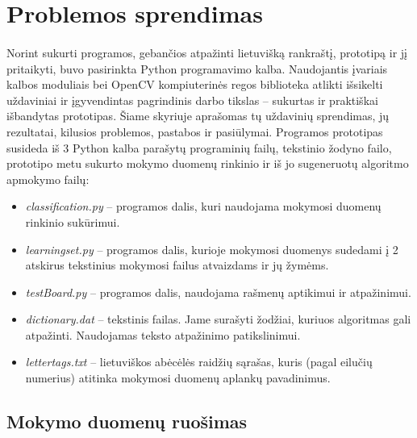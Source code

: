 \documentclass[a4paper,12pt]{article}
\begin{document}
\clearpage
\section{Problemos sprendimas}

\paragraph{} Norint sukurti programos, gebančios atpažinti lietuvišką rankraštį, prototipą ir jį pritaikyti, buvo pasirinkta Python programavimo kalba. Naudojantis įvariais kalbos moduliais bei OpenCV kompiuterinės regos biblioteka atlikti išsikelti uždaviniai ir įgyvendintas pagrindinis darbo tikslas – sukurtas ir praktiškai išbandytas prototipas. Šiame skyriuje aprašomas tų uždavinių sprendimas, jų rezultatai, kilusios problemos, pastabos ir pasiūlymai.
Programos prototipas susideda iš 3 Python kalba parašytų programinių failų, tekstinio žodyno failo, prototipo metu sukurto mokymo duomenų rinkinio ir iš jo sugeneruotų algoritmo apmokymo failų:
\begin{itemize}
	\item \textit{classification.py} – programos dalis, kuri naudojama mokymosi duomenų rinkinio sukūrimui.
	\item \textit{learningset.py} – programos dalis, kurioje mokymosi duomenys sudedami į 2 atskirus tekstinius mokymosi failus atvaizdams ir jų žymėms.
	\item \textit{testBoard.py} – programos dalis, naudojama rašmenų aptikimui ir atpažinimui.
	\item \textit{dictionary.dat} – tekstinis failas. Jame surašyti žodžiai, kuriuos algoritmas gali atpažinti. Naudojamas teksto atpažinimo patikslinimui.
	\item \textit{lettertags.txt} – lietuviškos abėcėlės raidžių sąrašas, kuris (pagal eilučių numerius) atitinka mokymosi duomenų aplankų pavadinimus.
\end{itemize}	



\subsection{Mokymo duomenų ruošimas}
\end{document}

